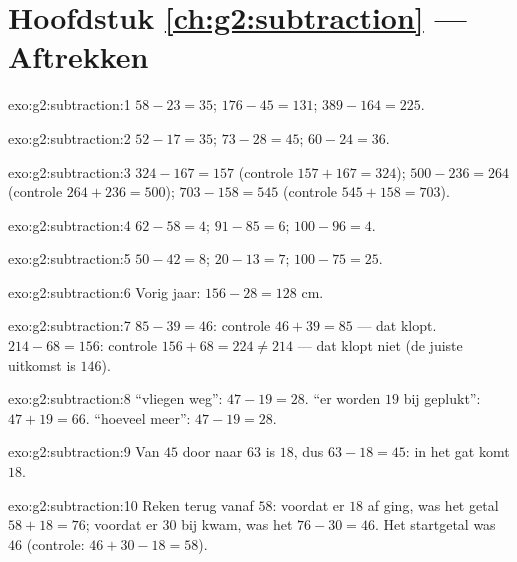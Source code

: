 \section*{Hoofdstuk \ref{ch:g2:subtraction} --- Aftrekken}

\begin{solution}{exo:g2:subtraction:1}
$58 - 23 = 35$; \quad $176 - 45 = 131$; \quad $389 - 164 = 225$.
\end{solution}

\begin{solution}{exo:g2:subtraction:2}
$52 - 17 = 35$; \quad $73 - 28 = 45$; \quad $60 - 24 = 36$.
\end{solution}

\begin{solution}{exo:g2:subtraction:3}
$324 - 167 = 157$ (controle $157 + 167 = 324$); \quad
$500 - 236 = 264$ (controle $264 + 236 = 500$); \quad
$703 - 158 = 545$ (controle $545 + 158 = 703$).
\end{solution}

\begin{solution}{exo:g2:subtraction:4}
$62 - 58 = 4$; \quad $91 - 85 = 6$; \quad $100 - 96 = 4$.
\end{solution}

\begin{solution}{exo:g2:subtraction:5}
$50 - 42 = 8$; \quad $20 - 13 = 7$; \quad $100 - 75 = 25$.
\end{solution}

\begin{solution}{exo:g2:subtraction:6}
Vorig jaar: $156 - 28 = 128$ cm.
\end{solution}

\begin{solution}{exo:g2:subtraction:7}
$85 - 39 = 46$: controle $46 + 39 = 85$ --- dat klopt.
$214 - 68 = 156$: controle $156 + 68 = 224 \neq 214$ --- dat klopt niet
(de juiste uitkomst is $146$).
\end{solution}

\begin{solution}{exo:g2:subtraction:8}
``vliegen weg'': $47 - 19 = 28$. ``er worden $19$ bij geplukt'':
$47 + 19 = 66$. ``hoeveel meer'': $47 - 19 = 28$.
\end{solution}

\begin{solution}{exo:g2:subtraction:9}
Van $45$ door naar $63$ is $18$, dus $63 - 18 = 45$: in het gat komt
$18$.
\end{solution}

\begin{solution}{exo:g2:subtraction:10}
Reken terug vanaf $58$: voordat er $18$ af ging, was het getal
$58 + 18 = 76$; voordat er $30$ bij kwam, was het $76 - 30 = 46$. Het
startgetal was $46$ (controle: $46 + 30 - 18 = 58$).
\end{solution}
